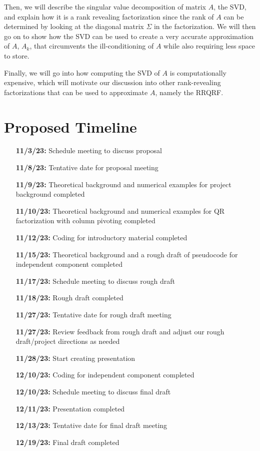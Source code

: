 \documentclass[10pt]{article}
\begin{document}
Then, we will describe the singular value decomposition of matrix $A$, the SVD, and explain how it is a rank revealing factorization since the rank of $A$ can be determined by looking at the diagonal matrix $\Sigma$ in the factorization. We will then go on to show how the SVD can be used to create a very accurate approximation of $A$, $A_k$, that circumvents the ill-conditioning of $A$ while also requiring less space to store.

Finally, we will go into how computing the SVD of $A$ is computationally expensive, which will motivate our discussion into other rank-revealing factorizations that can be used to approximate $A$, namely the RRQRF.

\section{Proposed Timeline}
\begin{itemize}[align=left,
  leftmargin=6em,
  itemindent=0pt,
  labelsep=0pt,
  labelwidth=6em,
  parsep=3.5pt]
    \item[\textbf{11/3/23: }] Schedule meeting to discuss proposal
    \item[\textbf{11/8/23: }] Tentative date for proposal meeting
    \item[\textbf{11/9/23: }] Theoretical background and numerical examples for project \\ background completed
    \item[\textbf{11/10/23: }] Theoretical background and numerical examples for QR factorization with column pivoting completed
    \item[\textbf{11/12/23: }] Coding for introductory material completed
    \item[\textbf{11/15/23: }] Theoretical background and a rough draft of pseudocode for \\ independent component completed
    \item[\textbf{11/17/23: }] Schedule meeting to discuss rough draft
    \item[\textbf{11/18/23: }] Rough draft completed
    \item[\textbf{11/27/23: }] Tentative date for rough draft meeting
    \item[\textbf{11/27/23: }] Review feedback from rough draft and adjust our rough draft/project directions as needed
    \item[\textbf{11/28/23: }] Start creating presentation
    \item[\textbf{12/10/23: }] Coding for independent component completed
    \item[\textbf{12/10/23: }] Schedule meeting to discuss final draft
    \item[\textbf{12/11/23: }] Presentation completed
    \item[\textbf{12/13/23: }] Tentative date for final draft meeting
    \item[\textbf{12/19/23: }] Final draft completed
\end{itemize}
\end{document}
